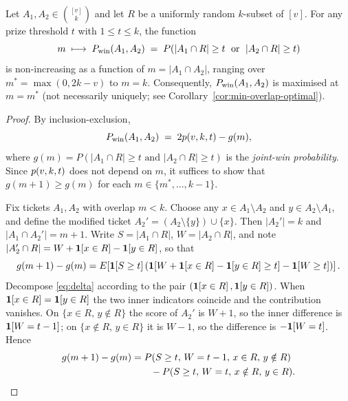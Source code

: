 \begin{theorem}
  \label{thm:two-ticket-monotone}
  Let $A_1, A_2 \in \binom{[v]}{k}$ and let $R$ be a uniformly random
  $k$-subset of $[v]$.  For any prize threshold $t$ with $1 \le t \le k$,
  the function
  \[
    m \;\longmapsto\; P_{\mathrm{win}}(A_1, A_2)
    \;=\; P(|A_1 \cap R| \ge t \;\text{ or }\; |A_2 \cap R| \ge t)
  \]
  is non-increasing as a function of $m = |A_1 \cap A_2|$, ranging over
  $m^* = \max(0, 2k-v)$ to $m = k$.  Consequently, $P_{\mathrm{win}}(A_1, A_2)$ is
  maximised at $m = m^*$ (not necessarily uniquely; see
  Corollary~\ref{cor:min-overlap-optimal}).
\end{theorem}

\begin{proof}
  By inclusion-exclusion,
  \begin{equation}
    \label{eq:ie}
    P_{\mathrm{win}}(A_1, A_2) \;=\; 2p(v,k,t) - g(m),
  \end{equation}
  where $g(m) = P(|A_1 \cap R| \ge t \text{ and } |A_2 \cap R| \ge t)$
  is the \emph{joint-win probability}.  Since $p(v,k,t)$ does not depend on
  $m$, it suffices to show that $g(m+1) \ge g(m)$ for each
  $m \in \{m^*, \ldots, k-1\}$.

  Fix tickets $A_1, A_2$ with overlap $m < k$.  Choose any
  $x \in A_1 \setminus A_2$ and $y \in A_2 \setminus A_1$, and define the
  modified ticket $A_2' = (A_2 \setminus \{y\}) \cup \{x\}$.  Then
  $|A_2'| = k$ and $|A_1 \cap A_2'| = m + 1$.  Write $S = |A_1 \cap R|$,
  $W = |A_2 \cap R|$, and note
  $|A_2' \cap R| = W + \mathbf{1}\!\left[x \in R\right] - \mathbf{1}\!\left[y \in R\right]$, so that
  \begin{equation}
    \label{eq:delta}
    g(m+1) - g(m)
    = E\!\left[\mathbf{1}\!\left[S \ge t\right]
       \left(\mathbf{1}\!\left[W + \mathbf{1}\!\left[x \in R\right] - \mathbf{1}\!\left[y \in R\right] \ge t\right]
           - \mathbf{1}\!\left[W \ge t\right]\right)\right].
  \end{equation}
  Decompose \eqref{eq:delta} according to the pair
  $(\mathbf{1}\!\left[x \in R\right], \mathbf{1}\!\left[y \in R\right])$.  When $\mathbf{1}\!\left[x \in R\right] = \mathbf{1}\!\left[y \in R\right]$
  the two inner indicators coincide and the contribution vanishes.  On
  $\{x \in R,\, y \notin R\}$ the score of $A_2'$ is $W + 1$, so the inner
  difference is $\mathbf{1}\!\left[W = t-1\right]$; on $\{x \notin R,\, y \in R\}$ it is
  $W - 1$, so the difference is $-\mathbf{1}\!\left[W = t\right]$.  Hence
  \begin{align}
    g(m+1) - g(m)
    &= P(S \ge t,\, W = t-1,\, x \in R,\, y \notin R) \notag \\
    &\qquad - P(S \ge t,\, W = t,\, x \notin R,\, y \in R).
    \label{eq:delta2}
  \end{align}


\end{proof}
